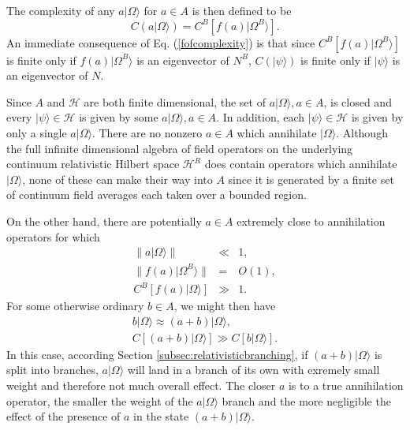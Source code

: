 \documentclass[twocolumn,amsmath,amssymb]{revtex4-1}
\begin{document}
The complexity of any $ a|\Omega \rangle $ for $a \in A$ is then defined to be
\begin{equation}
 \label{fofcomplexity}
 C(a |\Omega \rangle ) =  C^B[ f(a) |\Omega^B \rangle ].
\end{equation}
An immediate consequence of Eq. (\ref{fofcomplexity}) is that
since $C^B[ f(a) |\Omega^B \rangle ]$ is finite only if $ f(a) |\Omega^B \rangle $ is an
eigenvector of $N^B$, $C(|\psi \rangle )$ is finite only if $|\psi \rangle $ is an eigenvector of $N$.

Since $A$ and $\mathcal{H}$ are both finite dimensional, the set of
$a |\Omega \rangle , a \in A$, is closed and every $|\psi \rangle  \in \mathcal{H}$
is given by some $a |\Omega \rangle , a \in A$. In addition, each
$|\psi \rangle  \in \mathcal{H}$ is given by only a single $a |\Omega \rangle $.
There are no nonzero $a \in A$ which annihilate $|\Omega \rangle $. 
Although the
full infinite dimensional
algebra of field operators on the 
underlying continuum relativistic Hilbert space $\mathcal{H}^R$ does
contain operators which annihilate $|\Omega \rangle $, none of these can make
their way into $A$ since it is generated by a finite set of
continuum field averages each taken over a bounded region.

On the other hand, there are potentially $a \in A$
extremely close to annihilation operators for which
\begin{subequations}
  \begin{eqnarray}
\label{asmall}
    \parallel a |\Omega \rangle  \parallel &\ll& 1, \\
\label{fasmall}
    \parallel f( a) |\Omega^B \rangle  \parallel &=& O(1), \\
\label{canotsmall}
    C^B[ f(a) |\Omega \rangle ] &\gg& 1.
  \end{eqnarray}
\end{subequations}
For some otherwise ordinary $b \in A$, we might then have
\begin{subequations}
  \begin{eqnarray}
\label{anearb}
    b|\Omega \rangle  \approx (a + b) |\Omega \rangle  , \\
\label{canotsmall1}
    C[ (a + b)  |\Omega \rangle ] \gg C[ b |\Omega \rangle ].
  \end{eqnarray}
\end{subequations}
In this case, according
Section \ref{subsec:relativisticbranching}, if
$(a + b) |\Omega \rangle $ is split into branches, $a |\Omega \rangle $ will
land in a branch of its own with exremely small weight
and therefore not much overall effect. The closer
$a$ is to a true annihilation operator, the smaller
the weight of the $a |\Omega \rangle $ branch and
the more negligible the effect of the presence of $a$
in the state $(a + b) |\Omega \rangle $.
\end{document}
